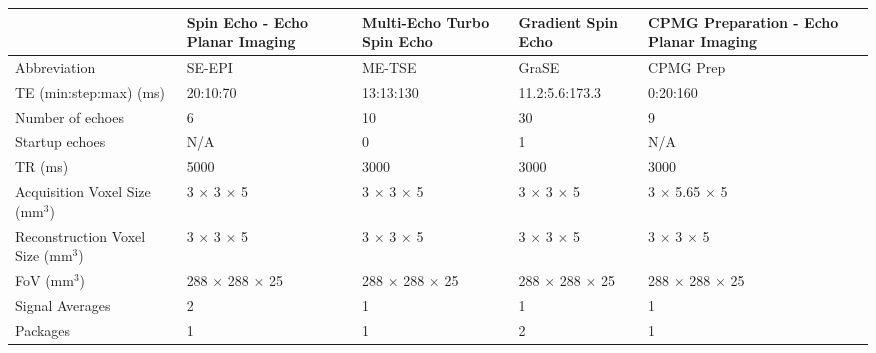 \begin{table}[H]
	\centering
	\begin{adjustbox}{width=1.0\textwidth, center}
	\begin{tabularx}{1.25\textwidth}{X|X|X|X|X}
		                                                     & Spin Echo - Echo Planar Imaging & Multi-Echo Turbo Spin Echo & Gradient Spin Echo & CPMG \ttwo Preparation - Echo Planar Imaging \\ \hline
		Abbreviation                                         & SE-EPI                          & ME-TSE                     & GraSE              & CPMG \ttwo Prep     \\ \hline
		TE (min:step:max) (ms)                               & 20:10:70                        & 13:13:130                  & 11.2:5.6:173.3     & 0:20:160            \\ \hline
		Number of   echoes                                   & 6                               & 10                         & 30                 & 9                   \\ \hline
		Startup echoes                                       & N/A                             & 0                          & 1                  & N/A                 \\ \hline
		TR (ms)                                              & 5000                            & 3000                       & 3000               & 3000                \\ \hline
		Acquisition Voxel Size   (mm$^3$)                    & 3 $\times$ 3 $\times$ 5         & 3 $\times$ 3 $\times$ 5    &3 $\times$ 3 $\times$ 5 &3 $\times$ 5.65 $\times$ 5\\ \hline
		Reconstruction Voxel Size   (mm$^3$)                 & 3 $\times$ 3 $\times$ 5         & 3 $\times$ 3 $\times$ 5    &3 $\times$ 3 $\times$ 5 &3 $\times$ 3 $\times$ 5\\ \hline
		FoV (mm$^3$)                                         & 288 $\times$ 288 $\times$ 25    & 288 $\times$ 288 $\times$ 25&288 $\times$ 288 $\times$ 25&288 $\times$ 288 $\times$ 25\\ \hline
		Signal   Averages                                    & 2                               & 1                          & 1                  & 1                   \\ \hline
		Packages                                             & 1                               & 1                          & 2                  & 1                   \\ \hline

\end{tabularx}
\end{adjustbox}
\end{table}
